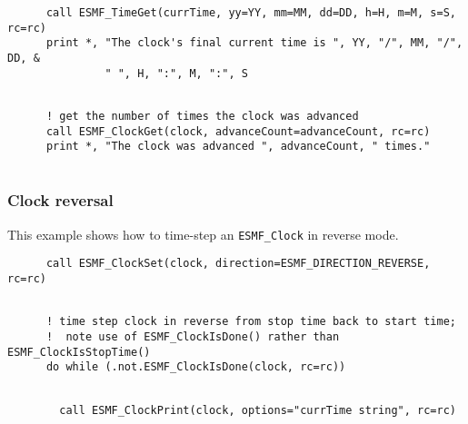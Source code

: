 
 \begin{verbatim}
      call ESMF_TimeGet(currTime, yy=YY, mm=MM, dd=DD, h=H, m=M, s=S, rc=rc) 
      print *, "The clock's final current time is ", YY, "/", MM, "/", DD, &
               " ", H, ":", M, ":", S
 
\end{verbatim}
 

 \begin{verbatim}
      ! get the number of times the clock was advanced
      call ESMF_ClockGet(clock, advanceCount=advanceCount, rc=rc)
      print *, "The clock was advanced ", advanceCount, " times."
 
\end{verbatim}
 

  \subsubsection{Clock reversal}
 
   This example shows how to time-step an {\tt ESMF\_Clock} in reverse mode. 

 \begin{verbatim}
      call ESMF_ClockSet(clock, direction=ESMF_DIRECTION_REVERSE, rc=rc)
 
\end{verbatim}
 

 \begin{verbatim}
      ! time step clock in reverse from stop time back to start time;
      !  note use of ESMF_ClockIsDone() rather than ESMF_ClockIsStopTime()
      do while (.not.ESMF_ClockIsDone(clock, rc=rc))
 
\end{verbatim}
 

 \begin{verbatim}
        call ESMF_ClockPrint(clock, options="currTime string", rc=rc)
 
\end{verbatim}
 
